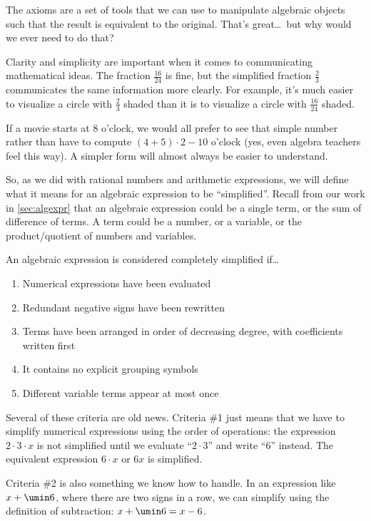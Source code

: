 The axioms are a set of tools that we can use to manipulate algebraic objects such that the result is equivalent to the original. That's great\ldots\ but why would we ever need to do that?

Clarity and simplicity are important when it comes to communicating mathematical ideas. The fraction $\frac{16}{24}$ is fine, but the simplified fraction $\frac{2}{3}$ communicates the same information more clearly. For example, it's much easier to visualize a circle with $\frac{2}{3}$ shaded than it is to visualize a circle with $\frac{16}{24}$ shaded.

If a movie starts at 8 o'clock, we would all prefer to see that simple number rather than have to compute $(4+5)\cdot2-10$ o'clock (yes, even algebra teachers feel this way). A simpler form will almost always be easier to understand.

So, as we did with rational numbers and arithmetic expressions, we will define what it means for an algebraic expression to be ``simplified''. Recall from our work in \cref{sec:algexpr} that an \gls{algebraic expression} could be a single term, or the sum of difference of terms. A \gls{term} could be a number, or a variable, or the product/quotient of numbers and variables.

\begin{boxcrit}
An algebraic expression is considered completely simplified if\ldots
\begin{enumerate}
	\item Numerical expressions have been evaluated
	\item Redundant negative signs have been rewritten
	\item Terms have been arranged in order of decreasing degree, with coefficients written first
	\item It contains no explicit grouping symbols
	\item Different variable terms appear at most once
\end{enumerate}
\end{boxcrit}

Several of these criteria are old news. Criteria \#1 just means that we have to simplify numerical expressions using the order of operations: the expression $2 \cdot 3 \cdot x$ is not simplified until we evaluate ``$2 \cdot 3$'' and write ``6'' instead. The equivalent expression $6 \cdot x$ or $6x$ is simplified.

Criteria \#2 is also something we know how to handle. In an expression like $x + \umin6$, where there are two signs in a row, we can simplify using the definition of subtraction: $x + \umin6 = x - 6$.

